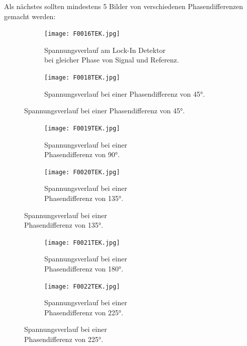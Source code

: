 \documentclass[
  bibliography=totoc,     %
  captions=tableheading,  %
  titlepage=firstiscover, %
]{scrartcl}
\begin{document}
\\
\\
\\
\\
\\
Als nächstes sollten mindestens 5 Bilder von verschiedenen Phasendifferenzen gemacht werden:
\begin{figure}[htb]
  \centering
  \begin{subfigure}{0.48\textwidth}
    \centering
    \texttt{[image: F0016TEK.jpg]}
    \caption{Spannungsverlauf am Lock-In Detektor\\ bei gleicher Phase von Signal und Referenz.}
    \label{fig:7}
    \qquad
  \end{subfigure}
  \begin{subfigure}{0.48\textwidth}
    \centering
    \texttt{[image: F0018TEK.jpg]}
    \caption{Spannungsverlauf bei einer Phasendifferenz von 45°.}
    \label{fig:8}
    \qquad
  \end{subfigure}
\end{figure}
\begin{figure}[htb]
  \centering
  \begin{subfigure}{0.48\textwidth}
    \centering
    \texttt{[image: F0019TEK.jpg]}
    \caption{Spannungsverlauf bei einer\\ Phasendifferenz von 90°.}
    \label{fig:9}
    \qquad
  \end{subfigure}
  \begin{subfigure}{0.48\textwidth}
    \centering
    \texttt{[image: F0020TEK.jpg]}
    \caption{Spannungsverlauf bei einer\\ Phasendifferenz von 135°.}
    \label{fig:10}
    \qquad
  \end{subfigure}
\end{figure}
\begin{figure}[htb]
  \centering
  \begin{subfigure}{0.48\textwidth}
    \centering
    \texttt{[image: F0021TEK.jpg]}
    \caption{Spannungsverlauf bei einer\\ Phasendifferenz von 180°.}
    \label{fig:11}
    \qquad
  \end{subfigure}
  \begin{subfigure}{0.48\textwidth}
    \centering
    \texttt{[image: F0022TEK.jpg]}
    \caption{Spannungsverlauf bei einer\\ Phasendifferenz von 225°.}
    \label{fig:12}
    \qquad
  \end{subfigure}
\end{figure}
\end{document}
